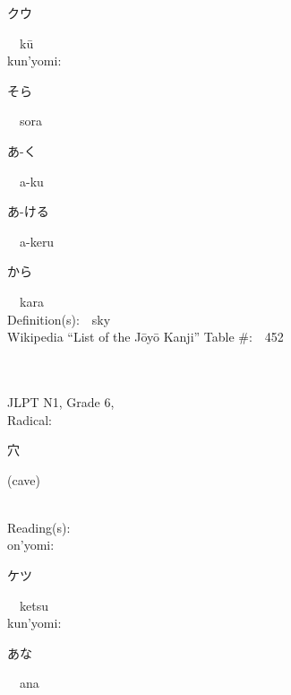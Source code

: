 \begin{multicols}{2}
{\hspace*{2em}}{\begin{CJK}{UTF8}{min} クウ \end{CJK}}\ \ k\=u\ \ \\
{\hspace*{1em}}kun'yomi:\ \ \\
{\hspace*{2em}}{\begin{CJK}{UTF8}{min} そら \end{CJK}}\ \ sora\ \ \\
{\hspace*{2em}}{\begin{CJK}{UTF8}{min} あ-く \end{CJK}}\ \ a-ku\ \ \\
{\hspace*{2em}}{\begin{CJK}{UTF8}{min} あ-ける \end{CJK}}\ \ a-keru\ \ \\
{\hspace*{2em}}{\begin{CJK}{UTF8}{min} から \end{CJK}}\ \ kara\ \ \\
Definition(s):\ \ sky \\
Wikipedia ``List of the J\=oy\=o Kanji'' Table \#:\ \ 452 \\
\ \ \\
{\fontsize{34pt}{40pt}  }\ \ \\  %
{JLPT N1, Grade 6, \\Radical:\ \ {\begin{CJK}{UTF8}{min} 穴 \end{CJK}} (cave) } \\
Reading(s):\ \ \\
{\hspace*{1em}}on'yomi:\ \ \\
{\hspace*{2em}}{\begin{CJK}{UTF8}{min} ケツ \end{CJK}}\ \ ketsu\ \ \\
{\hspace*{1em}}kun'yomi:\ \ \\
{\hspace*{2em}}{\begin{CJK}{UTF8}{min} あな \end{CJK}}\ \ ana\ \ \\

\end{multicols}
